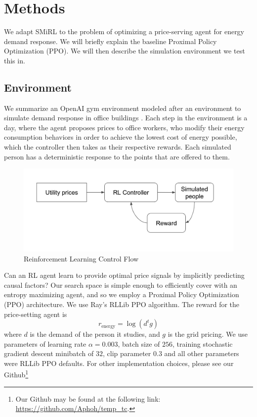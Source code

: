 \section{Methods}\label{sec:methods}

We adapt SMiRL to the problem of optimizing a price-serving agent for energy demand response. 
We will briefly explain the baseline Proximal Policy Optimization (PPO).
We will then describe the simulation environment we test this in. 

\subsection{Environment}

We summarize an OpenAI gym environment modeled after an environment to simulate demand response in office buildings \cite{spangherofficelearn}.  
Each step in the environment is a day, where the agent proposes prices to office workers, 
who modify their energy consumption behaviors in order to achieve the lowest cost of energy possible, 
which the controller then takes as their respective rewards. 
Each simulated person has a deterministic response to the points that are offered to them.

\begin{figure}
\centerline{
\includegraphics[width=0.9\linewidth]{graphics/RLcontroller.png}
}
\caption{Reinforcement Learning Control Flow} \label{fig:RLcontroller}
\end{figure}

Can an RL agent learn to provide optimal price signals by implicitly predicting causal factors? 
Our search space is simple enough to efficiently cover with an entropy maximizing agent, and so we employ a Proximal Policy Optimization (PPO) architecture. 
We use Ray's RLLib PPO algorithm.
The reward for the price-setting agent is 
$$ r_{\text{energy}} = \log(d^tg) $$
where $d$ is the demand of the person it studies, and $g$ is the grid pricing. 
We use parameters of learning rate $ 
\alpha = 0.003$, batch size of $ 256 $, training stochastic gradient descent 
minibatch of $ 32 $, clip parameter $ 0.3 $ and all other parameters were RLLib
PPO defaults. 
For other implementation choices, please see our Github\footnote{Our Github may be found at the following link: \url{https://github.com/Aphoh/temp_tc}.}

